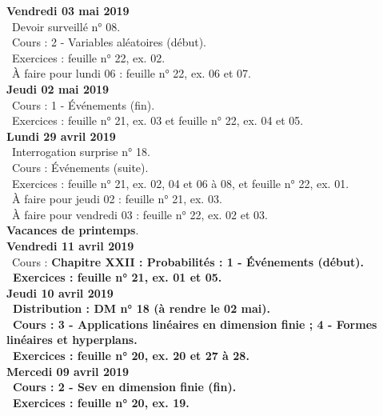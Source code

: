 \documentclass[12pt,a4paper]{article}
\begin{document}
\noindent\textbf{Vendredi 03 mai 2019}\\
\bu\ Devoir surveillé n° 08.\\
\bu\ Cours : 2 - Variables aléatoires (début).\\
\bu\ Exercices : feuille n° 22, ex. 02.\\
\bu\ À faire pour lundi 06 : feuille n° 22, ex. 06 et 07.\vspace{.4cm}\\

\noindent\textbf{Jeudi 02 mai 2019}\\
\bu\ Cours : 1 - Événements (fin).\\
\bu\ Exercices : feuille n° 21, ex. 03 et feuille n° 22, ex. 04 et 05.\vspace{.4cm}\\

\noindent\textbf{Lundi 29 avril 2019}\\
\bu\ Interrogation surprise n° 18.\\
\bu\ Cours : Événements (suite).\\
\bu\ Exercices : feuille n° 21, ex. 02, 04 et 06 à 08, et feuille n° 22, ex. 01.\\
\bu\ À faire pour jeudi 02 : feuille n° 21, ex. 03.\\
\bu\ À faire pour vendredi 03 : feuille n° 22, ex. 02 et 03.\vspace{.4cm}\\

\noindent\textbf{\bf Vacances de printemps}.\vspace{.4cm}\\

\noindent\textbf{Vendredi 11 avril 2019}\\
\bu\ Cours : \bf Chapitre XXII \rm : Probabilités : 1 - Événements (début).\\
\bu\ Exercices : feuille n° 21, ex. 01 et 05.\vspace{.4cm}\\

\noindent\textbf{Jeudi 10 avril 2019}\\
\bu\ Distribution : DM n° 18 (à rendre le 02 mai).\\
\bu\ Cours : 3 - Applications linéaires en dimension finie ; 4 - Formes linéaires et hyperplans.\\
\bu\ Exercices : feuille n° 20, ex. 20 et 27 à 28.\vspace{.4cm}\\

\noindent\textbf{Mercedi 09 avril 2019}\\
\bu\ Cours : 2 - Sev en dimension finie (fin).\\
\bu\ Exercices : feuille n° 20, ex. 19.\vspace{.4cm}\\
\end{document}
